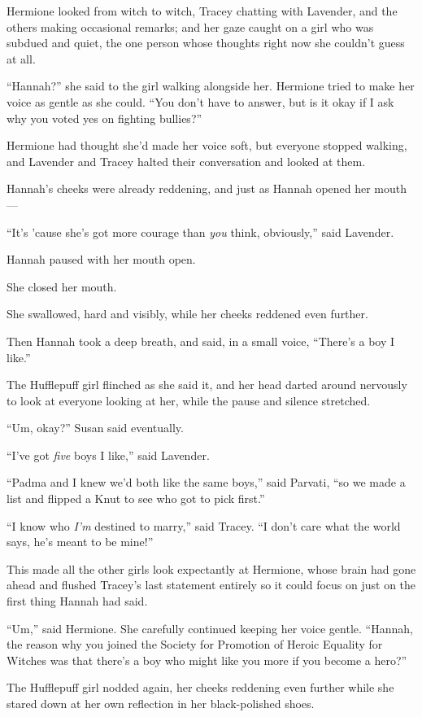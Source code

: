Hermione looked from witch to witch, Tracey chatting with Lavender, and
the others making occasional remarks; and her gaze caught on a girl who
was subdued and quiet, the one person whose thoughts right now she
couldn't guess at all.

``Hannah?'' she said to the girl walking alongside her. Hermione tried
to make her voice as gentle as she could. ``You don't have to answer,
but is it okay if I ask why you voted yes on fighting bullies?''

Hermione had thought she'd made her voice soft, but everyone stopped
walking, and Lavender and Tracey halted their conversation and looked at
them.

Hannah's cheeks were already reddening, and just as Hannah opened her
mouth---

``It's 'cause she's got more courage than \emph{you} think, obviously,''
said Lavender.

Hannah paused with her mouth open.

She closed her mouth.

She swallowed, hard and visibly, while her cheeks reddened even further.

Then Hannah took a deep breath, and said, in a small voice, ``There's a
boy I like.''

The Hufflepuff girl flinched as she said it, and her head darted around
nervously to look at everyone looking at her, while the pause and
silence stretched.

``Um, okay?'' Susan said eventually.

``I've got \emph{five} boys I like,'' said Lavender.

``Padma and I knew we'd both like the same boys,'' said Parvati, ``so we
made a list and flipped a Knut to see who got to pick first.''

``I know who \emph{I'm} destined to marry,'' said Tracey. ``I don't care
what the world says, he's meant to be mine!''

This made all the other girls look expectantly at Hermione, whose brain
had gone ahead and flushed Tracey's last statement entirely so it could
focus on just on the first thing Hannah had said.

``Um,'' said Hermione. She carefully continued keeping her voice gentle.
``Hannah, the reason why you joined the Society for Promotion of Heroic
Equality for Witches was that there's a boy who might like you more if
you become a hero?''

The Hufflepuff girl nodded again, her cheeks reddening even further
while she stared down at her own reflection in her black-polished shoes.

